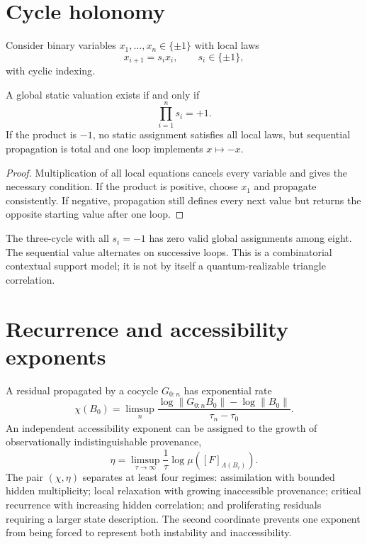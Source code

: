 \documentclass[11pt,a4paper]{article}
\begin{document}
\section{Cycle holonomy}
Consider binary variables $x_1,\ldots,x_n\in\{\pm1\}$ with local laws
\begin{equation}
x_{i+1}=s_ix_i,\qquad s_i\in\{\pm1\},
\end{equation}
with cyclic indexing.
\begin{theorem}
A global static valuation exists if and only if
\begin{equation}
\prod_{i=1}^ns_i=+1.
\end{equation}
If the product is $-1$, no static assignment satisfies all local laws, but sequential propagation is total and one loop implements $x\mapsto-x$.
\end{theorem}
\begin{proof}
Multiplication of all local equations cancels every variable and gives the necessary condition. If the product is positive, choose $x_1$ and propagate consistently. If negative, propagation still defines every next value but returns the opposite starting value after one loop.
\end{proof}
The three-cycle with all $s_i=-1$ has zero valid global assignments among eight. The sequential value alternates on successive loops. This is a combinatorial contextual support model; it is not by itself a quantum-realizable triangle correlation.

\section{Recurrence and accessibility exponents}
A residual propagated by a cocycle $G_{0:n}$ has exponential rate
\begin{equation}
\chi(B_0)=\limsup_n\frac{\log\|G_{0:n}B_0\|-\log\|B_0\|}{\tau_n-\tau_0}.
\end{equation}
An independent accessibility exponent can be assigned to the growth of observationally indistinguishable provenance,
\begin{equation}
\eta=\limsup_{\tau\to\infty}\frac1\tau\log \mu([F]_{\Lambda(B_\tau)}).
\end{equation}
The pair $(\chi,\eta)$ separates at least four regimes: assimilation with bounded hidden multiplicity; local relaxation with growing inaccessible provenance; critical recurrence with increasing hidden correlation; and proliferating residuals requiring a larger state description. The second coordinate prevents one exponent from being forced to represent both instability and inaccessibility.
\end{document}

